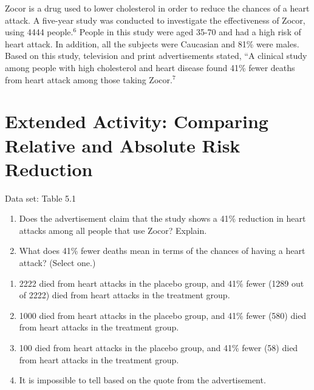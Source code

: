 \documentclass[
]{report}
\providecommand{\tightlist}{%
  \setlength{\itemsep}{0pt}\setlength{\parskip}{0pt}}
\begin{document}
Zocor is a drug used to lower cholesterol in order to reduce the chances of a heart attack. A five-year study was conducted to investigate the effectiveness of Zocor, using 4444 people.\(^6\) People in this study were aged 35-70 and had a high risk of heart attack. In addition, all the subjects were Caucasian and 81\% were males. Based on this study, television and print advertisements stated, ``A clinical study among people with high cholesterol and heart disease found 41\% fewer deaths from heart attack among those taking Zocor.\(^7\)

\hypertarget{extended-activity-comparing-relative-and-absolute-risk-reduction}{%
\section*{Extended Activity: Comparing Relative and Absolute Risk Reduction}\label{extended-activity-comparing-relative-and-absolute-risk-reduction}}

Data set: Table 5.1

\begin{enumerate}
\def\labelenumi{\arabic{enumi}.}
\setcounter{enumi}{24}
\item
  Does the advertisement claim that the study shows a 41\% reduction in heart attacks among all people that use Zocor? Explain.
\item
  What does 41\% fewer deaths mean in terms of the chances of having a heart attack? (Select one.)\\
\end{enumerate}

\begin{enumerate}
\def\labelenumi{\alph{enumi}.}
\tightlist
\item
  2222 died from heart attacks in the placebo group, and 41\% fewer (1289 out of 2222) died from heart attacks in the treatment group.\\
\item
  1000 died from heart attacks in the placebo group, and 41\% fewer (580) died from heart attacks in the treatment group.\\
\item
  100 died from heart attacks in the placebo group, and 41\% fewer (58) died from heart attacks in the treatment group.\\
\item
  It is impossible to tell based on the quote from the advertisement.
\end{enumerate}
\end{document}
